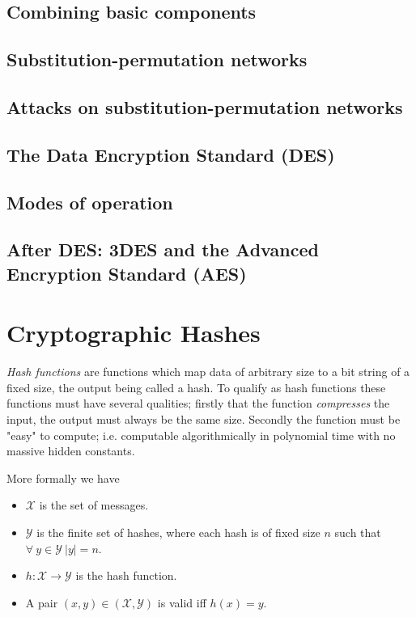 \documentclass{article}
\theoremstyle{quest}
\newcommand{\X}{\mathcal{X}}
\newcommand{\Y}{\mathcal{Y}}
\begin{document}
\subsection{Combining basic components}
\subsection{Substitution-permutation networks}
\subsection{Attacks on substitution-permutation networks}
\subsection{The Data Encryption Standard (DES)}
\subsection{Modes of operation}
\subsection{After DES: 3DES and the Advanced Encryption Standard (AES)}

\section{Cryptographic Hashes}

\textit{Hash functions} are functions which
map data of arbitrary size to a bit string of a fixed size,
the output being called a hash.
To qualify as hash functions these functions must have several qualities;
firstly that the function \textit{compresses} the input,
the output must always be the same size.
Secondly the function must be "easy" to compute;
i.e. computable algorithmically in polynomial time
with no massive hidden constants.

More formally we have
\begin{itemize}
	\item $\X$ is the set of messages.
	\item $\Y$ is the finite set of hashes,
		where each hash is of fixed size $n$ such that
		$\forall\ y \in \Y\ |y| = n$.
	\item $h : \X \rightarrow \Y$ is the hash function.
	\item A pair $(x,y) \in (\X,\Y)$ is valid iff $h(x) = y$.
\end{itemize}
\end{document}
